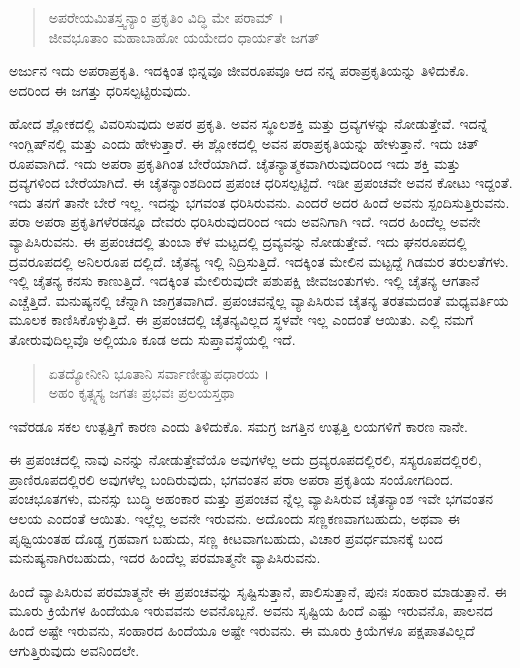 \begin{verse}
ಅಪರೇಯಮಿತಸ್ತ್ವನ್ಯಾಂ ಪ್ರಕೃತಿಂ ವಿದ್ಧಿ ಮೇ ಪರಾಮ್ ।\\ಜೀವಭೂತಾಂ ಮಹಾಬಾಹೋ ಯಯೇದಂ ಧಾರ್ಯತೇ ಜಗತ್ 
\end{verse}

{\small ಅರ್ಜುನ ಇದು ಅಪರಾಪ್ರಕೃತಿ. ಇದಕ್ಕಿಂತ ಭಿನ್ನವೂ ಜೀವರೂಪವೂ ಆದ ನನ್ನ ಪರಾಪ್ರಕೃತಿಯನ್ನು ತಿಳಿದುಕೊ. ಅದರಿಂದ ಈ ಜಗತ್ತು ಧರಿಸಲ್ಪಟ್ಟಿರುವುದು.}

ಹೋದ ಶ್ಲೋಕದಲ್ಲಿ ವಿವರಿಸುವುದು ಅಪರ ಪ್ರಕೃತಿ. ಅವನ ಸ್ಥೂಲಶಕ್ತಿ ಮತ್ತು ದ್ರವ್ಯಗಳನ್ನು ನೋಡುತ್ತೇವೆ. ಇದನ್ನೆ ಇಂಗ್ಲಿಷ್​ನಲ್ಲಿ  ಮತ್ತು  ಎಂದು ಹೇಳುತ್ತಾರೆ. ಈ ಶ್ಲೋಕದಲ್ಲಿ ಅವನ ಪರಾಪ್ರಕೃತಿಯನ್ನು ಹೇಳುತ್ತಾನೆ. ಇದು ಚಿತ್​ರೂಪವಾಗಿದೆ. ಇದು ಅಪರಾ ಪ್ರಕೃತಿಗಿಂತ ಬೇರೆಯಾಗಿದೆ. ಚೈತನ್ಯಾತ್ಮಕವಾಗಿರುವುದರಿಂದ ಇದು ಶಕ್ತಿ ಮತ್ತು ದ್ರವ್ಯಗಳಿಂದ ಬೇರೆಯಾಗಿದೆ. ಈ ಚೈತನ್ಯಾಂಶದಿಂದ ಪ್ರಪಂಚ ಧರಿಸಲ್ಪಟ್ಟಿದೆ. ಇಡೀ ಪ್ರಪಂಚವೇ ಅವನ ಕೋಟು ಇದ್ದಂತೆ. ಇದು ತನಗೆ ತಾನೇ ಬೇರೆ ಇಲ್ಲ. ಇದನ್ನು ಭಗವಂತ ಧರಿಸಿರುವನು. ಎಂದರೆ ಅದರ ಹಿಂದೆ ಅವನು ಸ್ಪಂದಿಸುತ್ತಿರುವನು. ಪರಾ ಅಪರಾ ಪ್ರಕೃತಿಗಳೆರಡನ್ನೂ ದೇವರು ಧರಿಸಿರುವುದರಿಂದ ಇದು ಅವನಿಗಾಗಿ ಇದೆ. ಇದರ ಹಿಂದೆಲ್ಲ ಅವನೇ ವ್ಯಾಪಿಸಿರುವನು. ಈ ಪ್ರಪಂಚದಲ್ಲಿ ತುಂಬಾ ಕೆಳ ಮಟ್ಟದಲ್ಲಿ ದ್ರವ್ಯವನ್ನು ನೋಡುತ್ತೇವೆ. ಇದು ಘನರೂಪದಲ್ಲಿ ದ್ರವರೂಪದಲ್ಲಿ ಅನಿಲರೂಪ ದಲ್ಲಿದೆ. ಚೈತನ್ಯ ಇಲ್ಲಿ ನಿದ್ರಿಸುತ್ತಿದೆ. ಇದಕ್ಕಿಂತ ಮೇಲಿನ ಮಟ್ಟದ್ದೆ ಗಿಡಮರ ತರುಲತೆಗಳು. ಇಲ್ಲಿ ಚೈತನ್ಯ ಕನಸು ಕಾಣುತ್ತಿದೆ. ಇದಕ್ಕಿಂತ ಮೇಲಿರುವುದೇ ಪಶುಪಕ್ಷಿ ಜೀವಜಂತುಗಳು. ಇಲ್ಲಿ ಚೈತನ್ಯ ಆಗತಾನೆ ಎಚ್ಚೆತ್ತಿದೆ. ಮನುಷ್ಯನಲ್ಲಿ ಚೆನ್ನಾಗಿ ಜಾಗ್ರತವಾಗಿದೆ. ಪ್ರಪಂಚವನ್ನೆಲ್ಲ ವ್ಯಾಪಿಸಿರುವ ಚೈತನ್ಯ ತರತಮದಂತೆ ಮಧ್ಯವರ್ತಿಯ ಮೂಲಕ ಕಾಣಿಸಿಕೊಳ್ಳುತ್ತಿದೆ. ಈ ಪ್ರಪಂಚದಲ್ಲಿ ಚೈತನ್ಯವಿಲ್ಲದ ಸ್ಥಳವೇ ಇಲ್ಲ ಎಂದಂತೆ ಆಯಿತು. ಎಲ್ಲಿ ನಮಗೆ ತೋರುವುದಿಲ್ಲವೊ ಅಲ್ಲಿಯೂ ಕೂಡ ಅದು ಸುಪ್ತಾವಸ್ಥೆಯಲ್ಲಿ ಇದೆ.

\begin{verse}
ಏತದ್ಯೋನೀನಿ ಭೂತಾನಿ ಸರ್ವಾಣೀತ್ಯುಪಧಾರಯ ।\\ಅಹಂ ಕೃತ್ಸ್ನಸ್ಯ ಜಗತಃ ಪ್ರಭವಃ ಪ್ರಲಯಸ್ತಥಾ 
\end{verse}

{\small ಇವೆರಡೂ ಸಕಲ ಉತ್ಪತ್ತಿಗೆ ಕಾರಣ ಎಂದು ತಿಳಿದುಕೊ. ಸಮಗ್ರ ಜಗತ್ತಿನ ಉತ್ಪತ್ತಿ ಲಯಗಳಿಗೆ ಕಾರಣ ನಾನೇ.}

ಈ ಪ್ರಪಂಚದಲ್ಲಿ ನಾವು ಎನನ್ನು ನೋಡುತ್ತೇವೆಯೊ ಅವುಗಳೆಲ್ಲ ಅದು ದ್ರವ್ಯರೂಪದಲ್ಲಿರಲಿ, ಸಸ್ಯರೂಪದಲ್ಲಿರಲಿ, ಪ್ರಾಣಿರೂಪದಲ್ಲಿರಲಿ ಅವುಗಳೆಲ್ಲ ಬಂದಿರುವುದು, ಭಗವಂತನ ಪರಾ ಅಪರಾ ಪ್ರಕೃತಿಯ ಸಂಯೋಗದಿಂದ. ಪಂಚಭೂತಗಳು, ಮನಸ್ಸು ಬುದ್ಧಿ ಅಹಂಕಾರ ಮತ್ತು ಪ್ರಪಂಚವ ನ್ನೆಲ್ಲ ವ್ಯಾಪಿಸಿರುವ ಚೈತನ್ಯಾಂಶ ಇವೇ ಭಗವಂತನ ಆಲಯ ಎಂದಂತೆ ಆಯಿತು. ಇಲ್ಲೆಲ್ಲ ಅವನೇ ಇರುವನು. ಅದೊಂದು ಸಣ್ಣಕಣವಾಗಬಹುದು, ಅಥವಾ ಈ ಪೃಥ್ವಿಯಂತಹ ದೊಡ್ಡ ಗ್ರಹವಾಗ ಬಹುದು, ಸಣ್ಣ ಕೀಟವಾಗಬಹುದು, ವಿಚಾರ ಪ್ರವರ್ಧಮಾನಕ್ಕೆ ಬಂದ ಮನುಷ್ಯನಾಗಿರಬಹುದು, ಇದರ ಹಿಂದೆಲ್ಲ ಪರಮಾತ್ಮನೇ ವ್ಯಾಪಿಸಿರುವನು.

ಹಿಂದೆ ವ್ಯಾಪಿಸಿರುವ ಪರಮಾತ್ಮನೇ ಈ ಪ್ರಪಂಚವನ್ನು ಸೃಷ್ಟಿಸುತ್ತಾನೆ, ಪಾಲಿಸುತ್ತಾನೆ, ಪುನಃ ಸಂಹಾರ ಮಾಡುತ್ತಾನೆ. ಈ ಮೂರು ಕ್ರಿಯೆಗಳ ಹಿಂದೆಯೂ ಇರುವವನು ಅವನೊಬ್ಬನೆ. ಅವನು ಸೃಷ್ಟಿಯ ಹಿಂದೆ ಎಷ್ಟು ಇರುವನೊ, ಪಾಲನದ ಹಿಂದೆ ಅಷ್ಟೇ ಇರುವನು, ಸಂಹಾರದ ಹಿಂದೆಯೂ ಅಷ್ಟೇ ಇರುವನು. ಈ ಮೂರು ಕ್ರಿಯೆಗಳೂ ಪಕ್ಷಪಾತವಿಲ್ಲದೆ ಆಗುತ್ತಿರುವುದು ಅವನಿಂದಲೇ.


